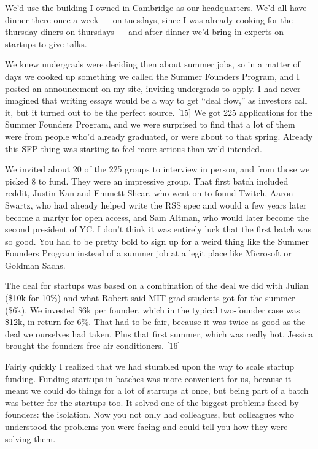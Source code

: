 We'd use the building I owned in Cambridge as our headquarters. We'd all
have dinner there once a week --- on tuesdays, since I was already
cooking for the thursday diners on thursdays --- and after dinner we'd
bring in experts on startups to give talks.

We knew undergrads were deciding then about summer jobs, so in a matter
of days we cooked up something we called the Summer Founders Program,
and I posted an \href{summerfounder.html}{announcement} on my site,
inviting undergrads to apply. I had never imagined that writing essays
would be a way to get ``deal flow,'' as investors call it, but it turned
out to be the perfect source. {[}\hyperref[f15n]{15}{]} We got 225
applications for the Summer Founders Program, and we were surprised to
find that a lot of them were from people who'd already graduated, or
were about to that spring. Already this SFP thing was starting to feel
more serious than we'd intended.

We invited about 20 of the 225 groups to interview in person, and from
those we picked 8 to fund. They were an impressive group. That first
batch included reddit, Justin Kan and Emmett Shear, who went on to found
Twitch, Aaron Swartz, who had already helped write the RSS spec and
would a few years later become a martyr for open access, and Sam Altman,
who would later become the second president of YC. I don't think it was
entirely luck that the first batch was so good. You had to be pretty
bold to sign up for a weird thing like the Summer Founders Program
instead of a summer job at a legit place like Microsoft or Goldman
Sachs.

The deal for startups was based on a combination of the deal we did with
Julian (\$10k for 10\%) and what Robert said MIT grad students got for
the summer (\$6k). We invested \$6k per founder, which in the typical
two-founder case was \$12k, in return for 6\%. That had to be fair,
because it was twice as good as the deal we ourselves had taken. Plus
that first summer, which was really hot, Jessica brought the founders
free air conditioners. {[}\hyperref[f16n]{16}{]}

Fairly quickly I realized that we had stumbled upon the way to scale
startup funding. Funding startups in batches was more convenient for us,
because it meant we could do things for a lot of startups at once, but
being part of a batch was better for the startups too. It solved one of
the biggest problems faced by founders: the isolation. Now you not only
had colleagues, but colleagues who understood the problems you were
facing and could tell you how they were solving them.

